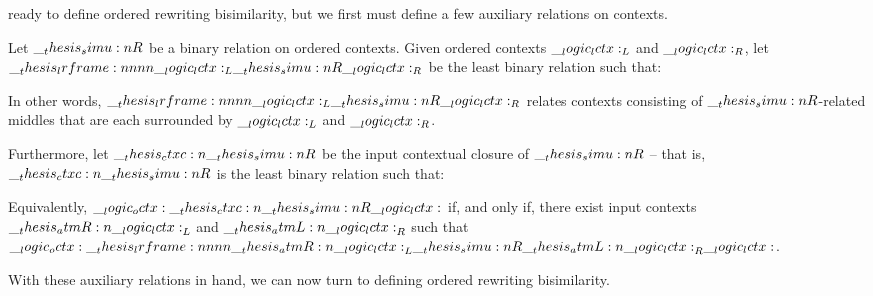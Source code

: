  ready to define ordered rewriting bisimilarity, but we first must define a few auxiliary relations on contexts.
%
\begin{definition}\label{def:ordered-bisimilarity:framed-relation}
  Let $\__thesis_simu:n {R}$ be a binary relation on ordered contexts.
  Given ordered contexts $\__logic_lctx:_L$ and $\__logic_lctx:_R$, let $\lrframe{\lctx_L}{\simu{R}}{\lctx_R}$ be the least binary relation such that:
  \begin{inferences}
  \end{inferences}
  In other words, $\lrframe{\lctx_L}{\simu{R}}{\lctx_R}$ relates contexts consisting of $\__thesis_simu:n {R}$-related middles that are each surrounded by $\__logic_lctx:_L$ and $\__logic_lctx:_R$.

  Furthermore, let $\ctxc{\simu{R}}$ be the input contextual closure of $\__thesis_simu:n {R}$ -- that is, $\ctxc{\simu{R}}$ is the least binary relation such that:
  Equivalently, $\octx \ctxc{\simu{R}} \lctx$ if, and only if, there exist input contexts $\__thesis_atmR:n {\__logic_lctx:}_L$ and $\__thesis_atmL:n {\__logic_lctx:}_R$ such that $\octx \lrframe{\atmR{\lctx}_L}{\simu{R}}{\atmL{\lctx}_R} \lctx$.
\end{definition}
\noindent
With these auxiliary relations in hand, we can now turn to defining ordered rewriting bisimilarity.
